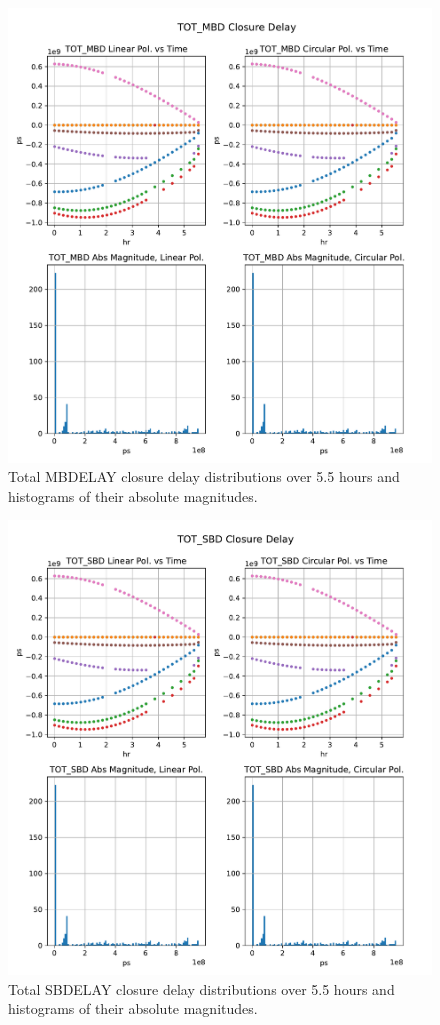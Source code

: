 \documentclass[letterpaper,twoside,12pt]{article}
\begin{document}
\begin{figure}[ht!]
  \begin{center}
  \includegraphics[width=40pc]{TOT_MBD_Closure_Delay.pdf}
  \caption{\small Total MBDELAY closure delay distributions over 5.5 hours and histograms of their absolute magnitudes.}
  \label{tot_mbd}
  \end{center}
\end{figure}


\begin{figure}[ht!]
  \begin{center}
  \includegraphics[width=40pc]{TOT_SBD_Closure_Delay.pdf}
  \caption{\small Total SBDELAY closure delay distributions over 5.5 hours and histograms of their absolute magnitudes.}
  \label{tot_mbd}
  \end{center}
\end{figure}
\end{document}
